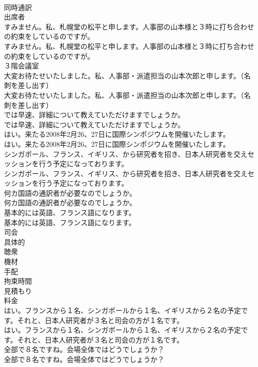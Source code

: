 \documentclass[8pt]{extreport}
\begin{document}
\begin{CJK}{UTF8}{min}
\\	同時通訳
\\	出席者
\\	すみません。私、札幌堂の松平と申します。人事部の山本様と３時に打ち合わせの約束をしているのですが。	
\\	すみません。私、札幌堂の松平と申します。人事部の山本様と３時に打ち合わせの約束をしているのですが。 
\\	３階会議室	
\\	大変お待たせいたしました。私、人事部・派遣担当の山本次郎と申します。（名刺を差し出す）	
\\	大変お待たせいたしました。私、人事部・派遣担当の山本次郎と申します。（名刺を差し出す） 
\\	では早速、詳細について教えていただけますでしょうか。	
\\	では早速、詳細について教えていただけますでしょうか。 
\\	はい。来たる2008年2月26、27日に国際シンポジウムを開催いたします。	
\\	はい。来たる2008年2月26、27日に国際シンポジウムを開催いたします。 
\\	シンガポール、フランス、イギリス、から研究者を招き、日本人研究者を交えセッションを行う予定になっております。	
\\	シンガポール、フランス、イギリス、から研究者を招き、日本人研究者を交えセッションを行う予定になっております。 
\\	何カ国語の通訳者が必要なのでしょうか。	
\\	何カ国語の通訳者が必要なのでしょうか。 
\\	基本的には英語、フランス語になります。	
\\	基本的には英語、フランス語になります。 
\\	司会
\\	具体的
\\	聴衆
\\	機材
\\	手配
\\	拘束時間
\\	見積もり
\\	料金
\\	はい。フランスから１名、シンガポールから１名、イギリスから２名の予定です。それと、日本人研究者が３名と司会の方が１名です。	
\\	はい。フランスから１名、シンガポールから１名、イギリスから２名の予定です。それと、日本人研究者が３名と司会の方が１名です。 
\\	全部で８名ですね。会場全体ではどうでしょうか？	
\\	全部で８名ですね。会場全体ではどうでしょうか？ 

\end{CJK}
\end{document}

